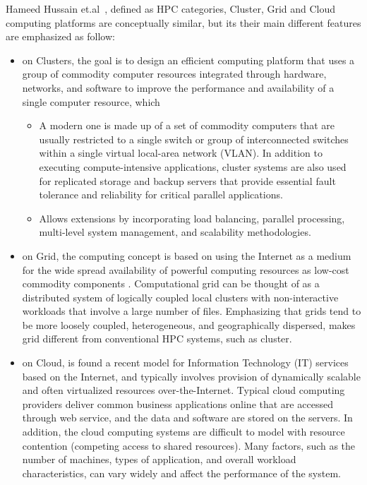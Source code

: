 Hameed Hussain et.al~\cite{survey_2}, defined as HPC categories, Cluster, Grid and Cloud computing platforms are conceptually similar, but its their main different features are emphasized as follow: 

\begin{itemize}
    
    \item  on Clusters, the goal is to design an efficient computing platform that uses a group of commodity computer resources integrated through hardware, networks, and software to improve the performance and availability of a single computer resource, which 

    \begin{itemize}
    
        \item A modern one is made up of a set of commodity computers that are usually restricted to a single switch or group of interconnected switches within a single virtual local-area network (VLAN). In addition to executing compute-intensive applications, cluster systems are also used for replicated storage and backup servers that provide essential fault tolerance and reliability for critical parallel applications. 
        
        \item Allows extensions by incorporating load balancing, parallel processing, multi-level system management, and scalability methodologies. 
    
    \end{itemize}
    
    \item  on Grid, the computing concept is based on using the Internet as a medium for the wide spread availability of powerful computing resources as low-cost commodity components . Computational grid can be thought of as a distributed system of logically coupled local clusters with non-interactive workloads that involve a large number of files. Emphasizing that grids tend to be more loosely coupled, heterogeneous, and geographically dispersed, makes grid different from conventional HPC systems, such as cluster.

    \item  on Cloud, is found a recent model for Information Technology (IT) services based on the Internet, and typically involves provision of dynamically scalable and often virtualized resources over-the-Internet. Typical cloud computing providers deliver common business applications online that are accessed through web service, and the data and software are stored on the servers. In addition, the cloud computing systems are difficult to model with resource contention (competing access to shared resources). Many factors, such as the number of machines, types of application, and overall workload characteristics, can vary widely and affect the performance of the system.

\end{itemize}

